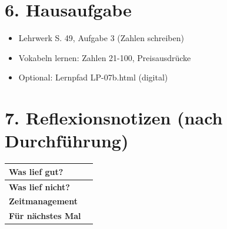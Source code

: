 \documentclass[11pt, a4paper]{article}
\newcommand{\sequenz}{07}
\newcommand{\block}{b}
\begin{document}

\section*{6. Hausaufgabe}

\begin{itemize}
    \item Lehrwerk S. 49, Aufgabe 3 (Zahlen schreiben)
    \item Vokabeln lernen: Zahlen 21-100, Preisausdrücke
    \item Optional: Lernpfad LP-\sequenz\block.html (digital)
\end{itemize}


\section*{7. Reflexionsnotizen (nach Durchführung)}

\begin{tabularx}{\textwidth}{|l|X|}
\hline
\textbf{Was lief gut?} & \\[2em]
\hline
\textbf{Was lief nicht?} & \\[2em]
\hline
\textbf{Zeitmanagement} & \\[2em]
\hline
\textbf{Für nächstes Mal} & \\[2em]
\hline
\end{tabularx}
\end{document}
